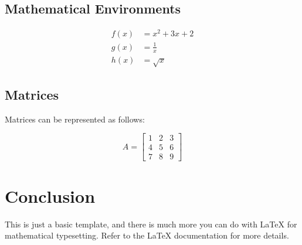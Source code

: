 \documentclass{article}
\begin{document}
\subsection{Mathematical Environments}

\begin{align}
  f(x) &= x^2 + 3x + 2 \\
  g(x) &= \frac{1}{x} \\
  h(x) &= \sqrt{x}
\end{align}

\subsection{Matrices}

Matrices can be represented as follows:

\[
A = \begin{bmatrix}
  1 & 2 & 3 \\
  4 & 5 & 6 \\
  7 & 8 & 9
\end{bmatrix}
\]

\section{Conclusion}

This is just a basic template, and there is much more you can do with LaTeX for mathematical typesetting. Refer to the LaTeX documentation for more details.

\end{document}
